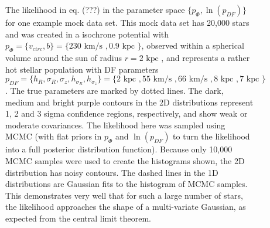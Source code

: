 \documentclass[12pt,preprint]{aastex}
\begin{document}
\begin{figure}
\caption{The likelihood in eq. (???) in the parameter space $\{p_\Phi,\ln(p_{DF})\}$ for one example mock data set. This mock data set has 20,000 stars and was created in a isochrone potential with $p_\Phi = \{v_{circ},b \}=\{230 \text{ km/s },0.9\text{ kpc } \}$, observed within a spherical volume around the sun of radius $r = 2 \text{ kpc }$, and represents a rather hot stellar population with DF parameters $p_{DF} = \{ h_R, \sigma_R, \sigma_z,h_{\sigma_R},h_{\sigma_z}\} =\{2 \text{ kpc }, 55 \text{ km/s }, 66 \text{ km/s }, 8 \text{ kpc }, 7 \text{ kpc }\} $.  The true parameters are marked by dotted lines. The dark, medium and bright purple contours in the 2D distributions represent 1, 2 and 3 sigma confidence regions, respectively, and show weak or moderate covariances. The likelihood here was sampled using MCMC (with flat priors in $p_\Phi$ and  $\ln(p_{DF})$ to turn the likelihood into a full posterior distribution function). Because only 10,000 MCMC samples were used to create the histograms shown, the 2D distribution has noisy contours. The dashed lines in the 1D distributions are Gaussian fits to the histogram of MCMC samples. This demonstrates very well that for such a large number of stars, the likelihood approaches the shape of a multi-variate Gaussian, as expected from the central limit theorem.}
\end{figure}

\end{document}
